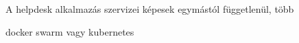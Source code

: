 A helpdesk alkalmazás szervizei képesek egymástól függetlenül, több 

docker swarm  vagy  kubernetes